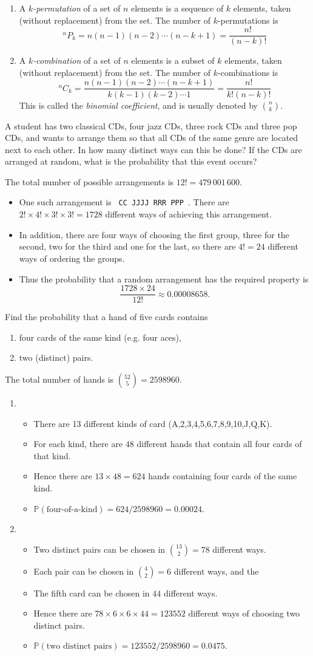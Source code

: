 \documentclass[lecture]{csm}
\newcommand{\prob}{\mathbb{P}}
\def\it{\item}
\def\bit{\begin{itemize}}
\def\eit{\end{itemize}}
\def\ben{\begin{enumerate}}
\def\een{\end{enumerate}}
\begin{document}
\begin{definition}
\ben
\it A \emph{$k$-permutation} of a set of $n$ elements is a sequence of $k$ elements, taken (without replacement) from the set. The number of $k$-permutations is
\[
^nP_k = n(n-1)(n-2)\cdots(n-k+1) = \frac{n!}{(n-k)!}
\]
\it A \emph{$k$-combination} of a set of $n$ elements is a subset of $k$ elements, taken (without replacement) from the set. The number of $k$-combinations is
\[
^nC_k = \frac{n(n-1)(n-2)\cdots(n-k+1)}{k(k-1)(k-2)\cdots 1} = \frac{n!}{k!(n-k)!}
\]
This is called the \emph{binomial coefficient}, and is usually denoted by $\binom{n}{k}$.
\een
\end{definition}

\begin{example}
A student has two classical CDs, four jazz CDs, three rock CDs and three pop CDs, and wants to arrange them so that all CDs of the same genre are located next to each other. In how many distinct ways can this be done? If the CDs are arranged at random, what is the probability that this event occurs?
\begin{solution}
The total number of possible arrangements is $12!= 479\,001\,600$.
\bit
\it 
One such arrangement is \texttt{\,CC\,JJJJ\,RRR\,PPP\,}. There are $2!\times 4!\times 3!\times 3! = 1728$ different ways of achieving this arrangement. 
\it
In addition, there are four ways of choosing the first group, three for the second, two for the third and one for the last, so there are $4!= 24$ different ways of ordering the groups.
\it
Thus the probability that a random arrangement has the required property is 
\[
\displaystyle\frac{1728\times 24}{12!}\approx 0.00008658.
\]
\eit
\end{solution}
\end{example}

\newpage %

\begin{example}
Find the probability that a hand of five cards contains 
\ben 
\it four cards of the same kind (e.g. four aces),
\it two (distinct) pairs.
\een
\begin{solution}
The total number of hands is $\binom{52}{5} = 2598960$.
\ben
\it
	\bit
	\it There are 13 different kinds of card (A,2,3,4,5,6,7,8,9,10,J,Q,K).
	\it For each kind, there are $48$ different hands that contain all four cards of that kind.
	\it Hence there are $13\times 48 = 624$ hands containing four cards of the same kind.
	\it $\prob(\text{four-of-a-kind}) = 624/2598960 = 0.00024$.
	\eit
\it 
	\bit
	\it Two distinct pairs can be chosen in $\binom{13}{2} = 78$ different ways.
	\it Each pair can be chosen in $\binom{4}{2} = 6$ different ways, and the 
	\it The fifth card can be chosen in $44$ different ways.
	\it Hence there are $78\times 6\times 6\times 44 = 123552$ different ways of choosing two distinct pairs.
	\it $\prob(\text{two distinct pairs}) = 123552/2598960 = 0.0475$.
	\eit
\een	
\end{solution}
\end{example}
\end{document}
